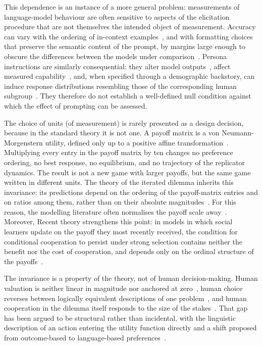 \documentclass[11pt,a4paper]{article}
\begin{document}
This dependence is an instance of a more general problem: measurements of
language-model behaviour are often sensitive to aspects of the elicitation
procedure that are not themselves the intended object of measurement. Accuracy
can vary with the ordering of in-context examples~\cite{lu2022fantastically},
and with formatting choices that preserve the semantic content of the prompt,
by margins large enough to obscure the differences between the models under
comparison~\cite{sclar2024quantifying}. Persona instructions are similarly
consequential: they alter model outputs~\cite{deshpande2023toxicity}, affect
measured capability~\cite{salewski2023context}, and, when specified through a
demographic backstory, can induce response distributions resembling those of
the corresponding human subgroup~\cite{argyle2023out}. They therefore do not
establish a well-defined null condition against which the effect of prompting
can be assessed.


The choice of units (of measurement)  is rarely presented as a design decision, because
in the standard theory it is not one. A payoff matrix is a von Neumann-Morgenstern
utility, defined only up to a positive affine
transformation~\cite{von2007theory,luce1957games}. Multiplying every
entry in the payoff matrix by ten changes no preference ordering, no best response, no
equilibrium, and no trajectory of the replicator dynamics. The result is not a
new game with larger payoffs, but the same game written in different units.  The
theory of the iterated dilemma inherits this invariance: its predictions depend 
on the ordering of the  payoff-matrix entries  and on ratios among them, rather than on
their absolute magnitudes~\cite{axelrod1981evolution,nowak1992tit,nowak1993strategy,pressDyson2012}.
For this reason, the modelling literature often normalises the payoff scale
away~\cite{szabo2007evolutionary,perc2010coevolutionary,wang2015universal}.
Moreover, Recent theory strengthens this point: in models in which social
learners update on the payoff they most recently received, the condition for
conditional cooperation to persist under strong selection contains neither the
benefit nor the cost of cooperation, and depends only on the ordinal structure
of the payoffs~\cite{glynatsi2024evolution}.

The invariance is a property of the theory, not of human decision-making. Human valuation is neither
linear in magnitude nor anchored at zero~\cite{kahneman1979prospect}, human
choice reverses between logically equivalent descriptions of one
problem~\cite{tversky1981framing}, and human cooperation in the dilemma itself
responds to the size of the stakes~\cite{krockow2016cooperation,list2006friend}.
That gap has been argued to be structural rather than incidental, with the
linguistic description of an action entering the utility function directly and
a shift proposed from outcome-based to language-based
preferences~\cite{capraro2024language}.
\end{document}
